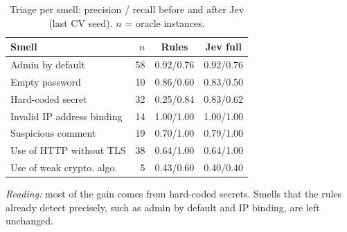 \begin{table}[t]\centering\caption{Triage per smell: precision / recall before and after Jev (last CV seed). $n$ = oracle instances.}\label{tab:rq3smell}
\scriptsize\setlength{\tabcolsep}{3pt}\begin{tabular}{lrcc}\toprule
Smell & $n$ & Rules & Jev full \\ \midrule
Admin by default & 58 & 0.92/0.76 & 0.92/0.76 \\
Empty password & 10 & 0.86/0.60 & 0.83/0.50 \\
Hard-coded secret & 32 & 0.25/0.84 & 0.83/0.62 \\
Invalid IP address binding & 14 & 1.00/1.00 & 1.00/1.00 \\
Suspicious comment & 19 & 0.70/1.00 & 0.79/1.00 \\
Use of HTTP without TLS & 38 & 0.64/1.00 & 0.64/1.00 \\
Use of weak crypto. algo. & 5 & 0.43/0.60 & 0.40/0.40 \\
\bottomrule\end{tabular}
\par\vspace{3pt}\parbox{\linewidth}{\footnotesize\emph{Reading:} most of the gain comes from hard-coded secrets. Smells that the rules already detect precisely, such as admin by default and IP binding, are left unchanged.}
\end{table}